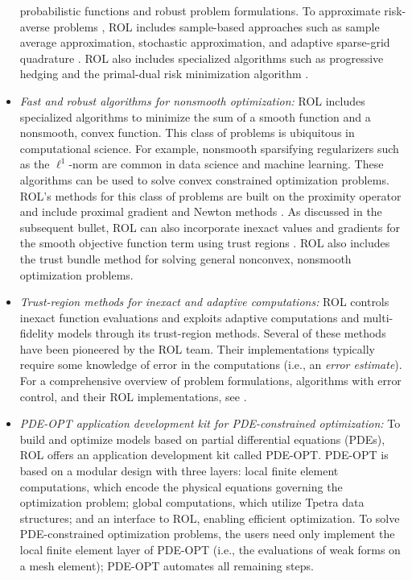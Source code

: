 \begin{itemize}
probabilistic functions and robust problem formulations. To approximate
risk-averse problems \cite{shapiro2021lectures}, ROL includes sample-based
approaches such as sample average approximation, stochastic approximation, and
adaptive sparse-grid quadrature \cite{kouri2013trust,kouri2014inexact}. ROL
also includes specialized algorithms such as progressive hedging
\cite{rockafellar1991scenarios} and the primal-dual risk minimization algorithm
\cite{kouri2022primal}.
\item
\emph{Fast and robust algorithms for nonsmooth optimization:}
ROL includes specialized algorithms to minimize the sum of a smooth function
and a nonsmooth, convex function.  This class of problems is ubiquitous in
computational science.  For example, nonsmooth sparsifying regularizers such as
the $\ell^1$-norm are common in data science and machine learning.  These
algorithms can be used to solve convex constrained optimization problems.
ROL's methods for this class of problems are built on the proximity operator
and include proximal gradient and Newton methods
\cite{beck2017first,kanzow2021globalized,ochs2014iPiano}.
As discussed in the subsequent bullet, ROL can also incorporate inexact
values and gradients for the smooth objective function term using trust regions
\cite{baraldi2023proximal}.
ROL also includes the trust bundle method \cite{schramm1992bundle}
for solving general nonconvex, nonsmooth optimization problems.
\item
\emph{Trust-region methods for inexact and adaptive computations:}
ROL controls inexact function evaluations and exploits adaptive computations
and multi-fidelity models through its trust-region methods. Several of these methods
have been pioneered by the ROL team.  Their implementations typically require some
knowledge of error in the computations (i.e., an \emph{error estimate}).
For a comprehensive overview of problem formulations, algorithms with error control,
and their ROL implementations, see \cite{Kouri2018}.
\item
\emph{PDE-OPT application development kit for PDE-constrained optimization:}
To build and optimize models based on partial differential equations (PDEs),
ROL offers an application development kit called PDE-OPT. PDE-OPT is based on a
modular design with three layers: local finite element computations,
which encode the physical equations governing the optimization problem;
global computations, which utilize Tpetra data structures;
and an interface to ROL, enabling efficient optimization.
To solve PDE-constrained optimization problems, the users need only implement the
local finite element layer of PDE-OPT (i.e., the evaluations of weak forms on
a mesh element); PDE-OPT automates all remaining steps.
\end{itemize}



